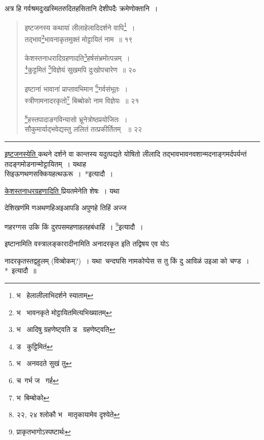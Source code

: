 \documentclass[11pt, openany]{book}
\begin{document}
अत्र हि गर्वश्रमदुःखस्मितरुदितहसितानि देशीपदैः क्रमेणोक्तानि~। 

\newpage

\begin{quote}
{\na इष्टजनस्य कथायां लीलाहेलादिदर्शने वापि\renewcommand{\thefootnote}{1}\footnote{भ \textendash\ हेलालीलाभिदर्शने स्याताम्}~।\\ 
 तद्भाव\renewcommand{\thefootnote}{2}\footnote{भ \textendash\ भावनकृते मोट्टायितमित्यभिख्यातम्}भावनाकृतमुक्तं मोट्टायितं नाम~॥ १९ 

 केशस्तनाधरादिग्रहणादति\renewcommand{\thefootnote}{3}\footnote{भ \textendash\ आदिषु ग्रहणेष्ट्वति ड \textendash\ ग्रहणेष्ट्वति}हर्षसंभ्रमोत्पन्नम्~।\\ 
 \renewcommand{\thefootnote}{4}\footnote{ड \textendash\ कुट्टिमितं}कुट्टमितं \renewcommand{\thefootnote}{5}\footnote{भ \textendash\ अनवदते सुखं तु}विज्ञेयं सुखमपि दुःखोपचारेण~॥ २० 

 इष्टानां भावानां प्राप्तावभिमान \renewcommand{\thefootnote}{6}\footnote{च\textendash\ गर्भ ज \textendash\ गर्ह}गर्वसंभूतः~।\\ 
 स्त्रीणामनादरकृतो\renewcommand{\thefootnote}{7}\footnote{भ\textendash\ बिम्बोको} बिब्बोको नाम विज्ञेयः~॥ २१ 

 \renewcommand{\thefootnote}{8}\footnote{२२, २४ श्लोकौ भ \textendash\ मातृकायामेव दृश्येते }हस्तपादाङगविन्यासो भ्रूनेत्रोष्ठप्रयोजितः~।\\ 
 सौकुमार्याद्भवेद्यस्तु ललितं तत्प्रकीर्तितम् ~॥ २२ }
\end{quote}

\hrule
 
\vspace{2mm}
\underline{इष्टजनस्येति }कथने दर्शने वा कान्तस्य यदुत्पद्यते योषितो लीलादि तद्भावभावनवशान्मदनाङ्गमर्दपर्यन्तं तदङ्गमोडनान्मोट्टायितम्~। यथाह\textendash\ \\

सिइऊणथणसक्कियहत्थऊरू~।\textendash\ *इत्यादौ~। 

\underline{केशस्तनाधरग्रहणादिति }प्रियतमेनेति शेषः~। यथा\textendash\ 

 देशिखणंमि णअथणहिअइआपडि अपुणहे तिहिं अज्ज\textendash\ 

 णहरग्गस उकि किं दुरपसमहणाहलहबंधाहिं~। \renewcommand{\thefootnote}{*}\footnote{प्राकृतभागोऽस्पष्टार्थः }इत्यादौ~। 

 इष्टानामिति वस्त्रालङ्कारादीनामिति अनादरकृत इति तद्विषय एव योऽ 

\noindent
नादरकृतस्तद्वहुलम् (विव्बोकम्?)~। यथा\textendash\ चन्दघसि नामकोप्पेस स तु किं दु आविळं उइआ को चण्ड~।*~इत्यादौ~॥ \\
\end{document}
